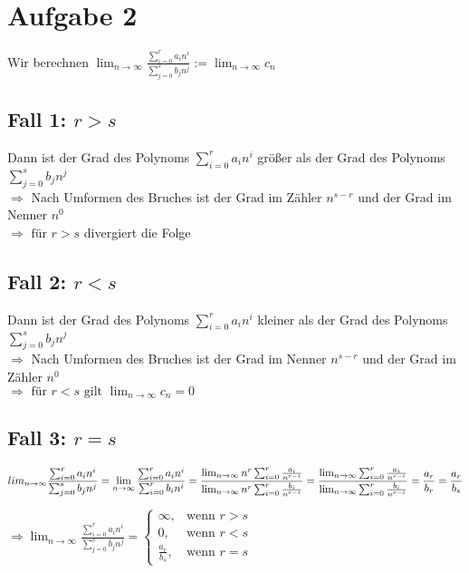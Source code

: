 \section{Aufgabe 2}
    Wir berechnen $\lim_{n \to \infty}\frac{\sum_{i=0}^ra_in^i}{\sum_{j=0}^sb_jn^j}:=\lim_{n \to \infty}c_n$
    \subsection{Fall 1: $r > s$}
        Dann ist der Grad des Polynoms $\sum_{i=0}^ra_in^i$ größer als der Grad des Polynoms $\sum_{j=0}^sb_jn^j$ \\
        $\Rightarrow $ Nach Umformen des Bruches ist der Grad im Zähler $n^{s-r}$ und der Grad im Nenner $n^0$ \\
        $\Rightarrow \text{ für } r>s $ divergiert die Folge
        
    \subsection{Fall 2: $r < s$}
        Dann ist der Grad des Polynoms $\sum_{i=0}^ra_in^i$ kleiner als der Grad des Polynoms $\sum_{j=0}^sb_jn^j$ \\
        $\Rightarrow $ Nach Umformen des Bruches ist der Grad im Nenner $n^{s-r}$ und der Grad im Zähler $n^0$ \\
        $\Rightarrow \text{ für } r<s \text{ gilt } \lim_{n \to \infty}c_n=0$
    \subsection{Fall 3: $r = s$}
        $$\\lim_{n \to \infty}\frac{\sum_{i=0}^ra_in^i}{\sum_{j=0}^sb_jn^j}=
        \lim_{n \to \infty}\frac{\sum_{i=0}^ra_in^i}{\sum_{i=0}^rb_in^i}
        =\frac{\lim_{n \to \infty}n^r\sum_{i=0}^r\frac{a_i}{n^{r-i}}}{\lim_{n \to \infty}n^r\sum_{i=0}^r\frac{b_i}{n^{r-i}}}
        =\frac{\lim_{n \to \infty}\sum_{i=0}^r\frac{a_i}{n^{r-i}}}{\lim_{n \to \infty}\sum_{i=0}^r\frac{b_i}{n^{r-i}}}
        =\frac{a_r}{b_r}
        =\frac{a_r}{b_s}$$

    $\Rightarrow \lim_{n \to \infty}\frac{\sum_{i=0}^ra_in^i}{\sum_{j=0}^sb_jn^j} = 
    \begin{cases}
        \infty, & \text{wenn } r > s \\
        0, & \text{wenn } r < s \\
        \frac{a_r}{b_s}, & \text{wenn } r = s
    \end{cases}$